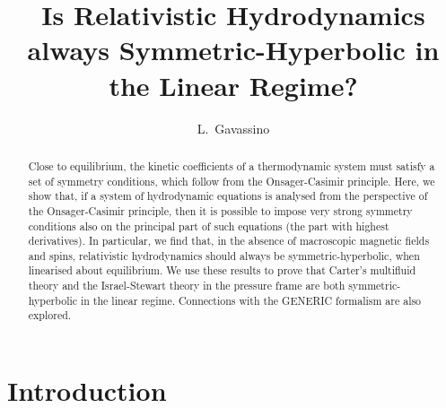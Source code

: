 \documentclass[a4paper, amsfonts, amssymb, amsmath, reprint, showkeys, nofootinbib, twoside, onecolumn,notitlepage]{revtex4-1}
\begin{document}
\title{Is Relativistic Hydrodynamics always Symmetric-Hyperbolic in the Linear Regime?}
\author{L.~Gavassino}


\begin{abstract}
Close to equilibrium, the kinetic coefficients of a thermodynamic system must satisfy a set of symmetry conditions, which follow from the Onsager-Casimir principle. Here, we show that, if a system of hydrodynamic equations is analysed from the perspective of the Onsager-Casimir principle, then it is possible to impose very strong symmetry conditions also on the principal part of such equations (the part with highest derivatives). In particular, we find that, in the absence of macroscopic magnetic fields and spins, relativistic hydrodynamics should always be symmetric-hyperbolic, when linearised about equilibrium. We use these results to prove that Carter's multifluid theory and the Israel-Stewart theory in the pressure frame are both symmetric-hyperbolic in the linear regime. Connections with the GENERIC formalism are also explored.
\end{abstract} 



\maketitle




\section{Introduction} 
\end{document}
